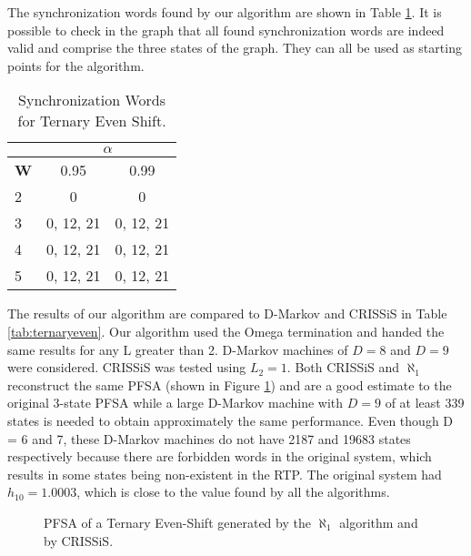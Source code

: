 {The synchronization words found by our algorithm are shown in Table \ref{tab:ternaryevensynch}. It is possible to check in the graph that all found synchronization words are indeed valid and comprise the three states of the graph. They can all be used as starting points for the algorithm.

\begin{table}
\centering
\caption{Synchronization Words for Ternary Even Shift. \label{tab:ternaryevensynch}}
\begin{tabular}{|l|c|c|}
\hline
 & \multicolumn{2}{c|}{\textbf{$\alpha$}}\\
 \hline
\textbf{W} & 0.95 & 0.99 \\
\hline
2 & 0 & 0 \\ 
3 & 0, 12, 21 & 0, 12, 21 \\ 
4 & 0, 12, 21 & 0, 12, 21 \\ 
5 & 0, 12, 21 & 0, 12, 21 \\
 \hline
\end{tabular}
\end{table}

The results of our algorithm are compared to D-Markov and CRISSiS in Table \ref{tab:ternaryeven}. Our algorithm used the Omega termination and handed the same results for any L greater than 2. D-Markov machines of $D = 8$ and $D = 9$ were considered. CRISSiS was tested using $L_2 = 1$. Both CRISSiS and $\aleph_1$ reconstruct the same PFSA (shown in Figure \ref{fig:ternaryevengen}) and are a good estimate to the original 3-state PFSA  while a large D-Markov machine with $D=9$ of at least 339 states is needed to obtain approximately the same performance. Even though D = 6 and 7, these D-Markov machines do not have 2187 and 19683 states respectively because there are forbidden words in the original system, which results in some states being non-existent in the RTP. The original system had $h_{10} = 1.0003$, which is close to the value found by all the algorithms.

\begin{figure}
\centering
{}
\caption{PFSA of a Ternary Even-Shift generated by the $\aleph_1$ algorithm and by CRISSiS.\label{fig:ternaryevengen}}
\end{figure}

}
